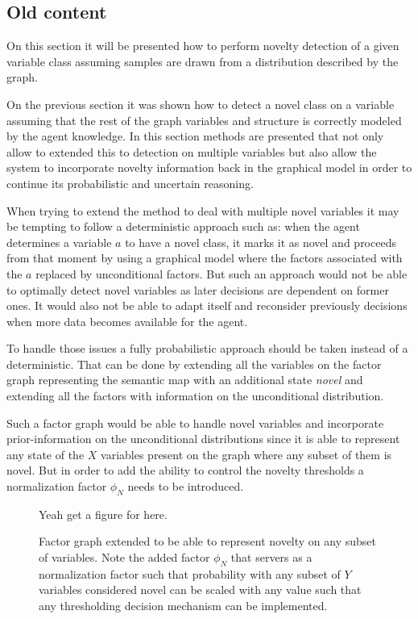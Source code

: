 \subsection{Old content}

On this section it will be presented how to perform novelty detection of a
given variable class assuming samples are drawn from a distribution described
by the graph.



On the previous section it was shown how to detect a novel class on a variable
assuming that the rest of the graph variables and structure is correctly modeled
by the agent knowledge.
In this section methods are presented that not only allow to extended this to
detection on multiple variables but also allow the system to incorporate
novelty information back in the graphical model in order to continue its
probabilistic and uncertain reasoning.

When trying to extend the method to deal with multiple novel variables it may
be tempting to follow a deterministic approach such as:
when the agent determines a variable $a$ to have a novel class, it marks it as
novel and proceeds from that moment by using a graphical model where the factors
associated with the $a$ replaced by unconditional factors.
But such an approach would not be able to optimally detect novel variables
as later decisions are dependent on former ones.
It would also not be able to adapt itself and reconsider previously decisions
when more data becomes available for the agent.

To handle those issues a fully probabilistic approach should be taken
instead of a deterministic.
That can be done by extending all the variables on the factor graph representing
the semantic map with an additional state \emph{novel} and extending all the
factors with information on the unconditional distribution.

Such a factor graph would be able to handle novel variables and incorporate
prior-information on the unconditional distributions since it is able to
represent any state of the $X$ variables present on the graph where any
subset of them is novel. But in order to add the ability to control the
novelty thresholds a normalization factor $\phi_N$ needs to be introduced.

\begin{figure}[h]
\centering
Yeah get a figure for here.
\caption{\label{fig:multiple-big-threshold}Factor graph extended to be able to
         represent novelty on any subset of variables. Note the added factor
         $\phi_N$ that servers as a normalization factor such that probability
         with any subset of $Y$ variables considered novel can be scaled with
         any value such that any thresholding decision mechanism can be
         implemented.}
\end{figure}

